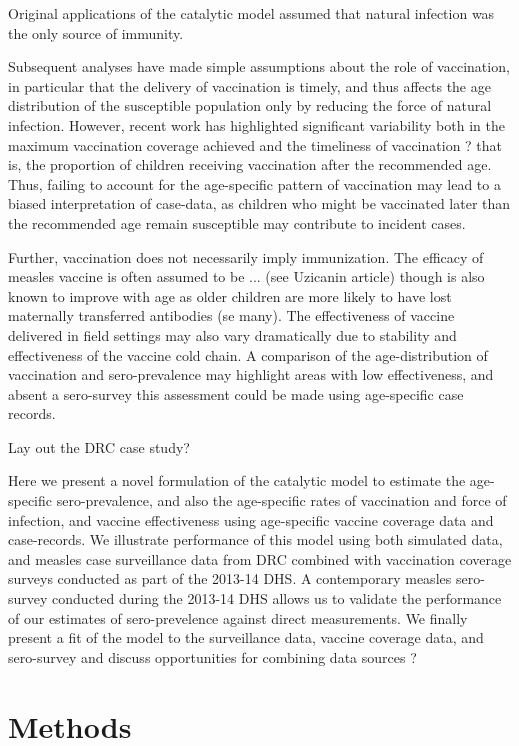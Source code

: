 \documentclass[nofootinbib,aps,pre,twocolumn,superscriptaddress,showkeys,showpacs]{revtex4-1}
\begin{document}
Original applications of the catalytic model assumed that natural infection was the only source of immunity.  

Subsequent analyses have made simple assumptions about the role of vaccination, in particular that the delivery of vaccination is timely, and thus affects the age distribution of the susceptible population only by reducing the force of natural infection.  However, recent work has highlighted significant variability both in the maximum vaccination coverage achieved and the timeliness of vaccination ? that is, the proportion of children receiving vaccination after the recommended age.  Thus, failing to account for the age-specific pattern of vaccination may lead to a biased interpretation of case-data, as children who might be vaccinated later than the recommended age remain susceptible may contribute to incident cases. 

Further, vaccination does not necessarily imply immunization.  The efficacy of measles vaccine is often assumed to be ... (see Uzicanin article) though is also known to improve with age as older children are more likely to have lost maternally transferred antibodies (se many). The effectiveness of vaccine delivered in field settings may also vary dramatically due to stability and effectiveness of the vaccine cold chain.  A comparison of the age-distribution of vaccination and sero-prevalence may highlight areas with low effectiveness, and absent a sero-survey this assessment could be made using age-specific case records.  

Lay out the DRC case study?

Here we present a novel formulation of the catalytic model to estimate the age-specific sero-prevalence, and also the age-specific rates of vaccination and force of infection, and vaccine effectiveness using age-specific vaccine coverage data and case-records. We illustrate performance of this model using both simulated data, and measles case surveillance data from DRC combined with vaccination coverage surveys conducted as part of the 2013-14 DHS.  A contemporary measles sero-survey conducted during the 2013-14 DHS allows us to validate the performance of our estimates of sero-prevelence against direct measurements. We finally present a fit of the model to the surveillance data, vaccine coverage data, and sero-survey and discuss opportunities for combining data sources ? 


\section{Methods \label{sec:Methods}}
\end{document}
